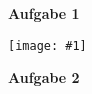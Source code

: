 \documentclass{gdv}
\newcommand {\bild}[1]{
         \begin{center}
         \texttt{[image: \#1]}
         \end{center}
}
\begin{document}
\begin{gdvSheet}
    
    \large{\textbf{Aufgabe 1\\}}
    \bild{Beispielbild.png}

    \large{\textbf{Aufgabe 2\\}}
    
\end{gdvSheet}
\end{document}
